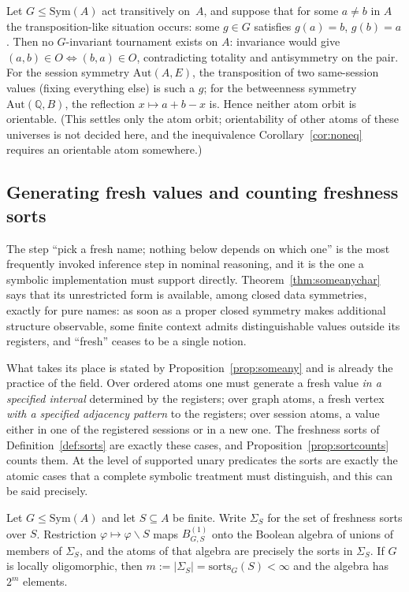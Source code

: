 \documentclass{lmcs}
\newcommand{\Sym}{\mathrm{Sym}}
\newcommand{\Aut}{\mathrm{Aut}}
\begin{document}
\begin{rem}
\label{rem:swaporbit}
Let $G\leq\Sym(A)$ act transitively on~$A$, and suppose that for some
$a\neq b$ in $A$ the transposition-like situation occurs: some $g\in
G$ satisfies $g(a)=b$, $g(b)=a$. Then no $G$-invariant tournament
exists on $A$: invariance would give $(a,b)\in O\Leftrightarrow
(b,a)\in O$, contradicting totality and antisymmetry on the pair.
For the session symmetry $\Aut(A,E)$, the transposition of two
same-session values (fixing everything else) is such a $g$; for the
betweenness symmetry $\Aut(\mathbb Q,B)$, the reflection $x\mapsto
a+b-x$ is. Hence neither atom orbit is orientable. (This settles
only the atom orbit; orientability of other atoms of these universes
is not decided here, and the inequivalence Corollary~\ref{cor:noneq}
requires an orientable atom somewhere.)
\end{rem}

\subsection{Generating fresh values and counting freshness sorts}
\label{subsec:freshmodelling}

The step ``pick a fresh name; nothing below depends on which one'' is
the most frequently invoked inference step in nominal reasoning, and it is the one a symbolic implementation must support directly.
Theorem~\ref{thm:someanychar} says that its unrestricted form is
available, among closed data symmetries, exactly for pure names: as soon
as a proper closed symmetry makes additional structure observable, some
finite context admits distinguishable values outside its registers, and
``fresh'' ceases to be a single notion.

What takes its place is stated by Proposition~\ref{prop:someany} and is
already the practice of the field. Over ordered atoms one must generate
a fresh value \emph{in a specified interval} determined by the
registers; over graph atoms, a fresh vertex \emph{with a specified
adjacency pattern} to the registers; over session atoms, a value either
in one of the registered sessions or in a new one. The freshness sorts
of Definition~\ref{def:sorts} are exactly these cases, and
Proposition~\ref{prop:sortcounts} counts them.
%
At the level of supported unary predicates the sorts are exactly the
atomic cases that a complete symbolic treatment must distinguish, and
this can be said precisely.

\begin{prop}\label{prop:sortalgebra}
Let $G\leq\Sym(A)$ and let $S\subseteq A$ be finite. Write
$\Sigma_S$ for the set of freshness sorts over $S$. Restriction
$\varphi\mapsto\varphi\smallsetminus S$ maps $B^{(1)}_{G,S}$ onto
the Boolean algebra of unions of members of $\Sigma_S$, and the atoms
of that algebra are precisely the sorts in $\Sigma_S$. If $G$ is
locally oligomorphic, then
$m:=|\Sigma_S|=\mathrm{sorts}_G(S)<\infty$ and the algebra has
$2^{m}$ elements.
\end{prop}
\end{document}

